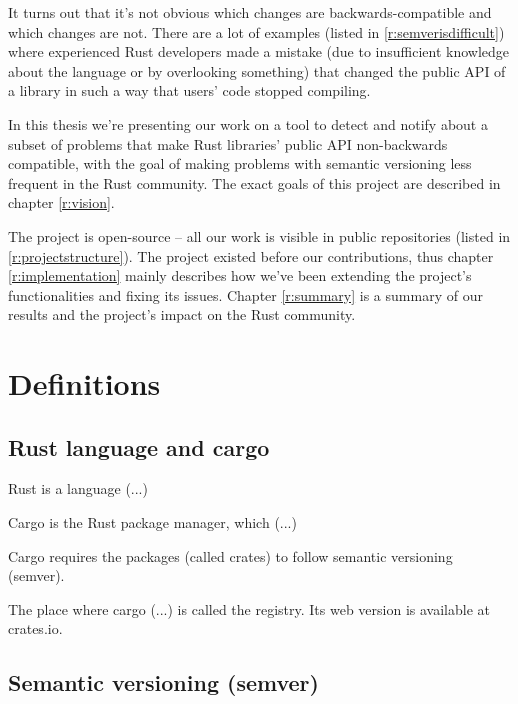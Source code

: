 \documentclass[licencjacka,en]{pracamgr}
\begin{document}
It turns out that it's not obvious which changes are backwards-compatible
and which changes are not. There are a lot of examples (listed in \ref{r:semverisdifficult})
where experienced Rust developers made a mistake 
(due to insufficient knowledge about the language or by overlooking something)
that changed the public API of a library in such a way that users' code stopped compiling.

In this thesis we're presenting our work on a tool to detect and notify about
a subset of problems that make Rust libraries' public API non-backwards compatible,
with the goal of making problems with semantic versioning less frequent in the Rust community.
The exact goals of this project are described in chapter \ref{r:vision}.

The project is open-source -- all our work is visible in public repositories
(listed in \ref{r:projectstructure}). The project existed before our contributions,
thus chapter \ref{r:implementation} mainly describes how we've 
been extending the project's functionalities and fixing its issues.
Chapter \ref{r:summary} is a summary of our results and the project's impact 
on the Rust community.



\chapter{Definitions}\label{r:definitions}

\section{Rust language and cargo}

Rust is a language (...)

Cargo is the Rust package manager, which (...)

Cargo requires the packages (called crates) to follow semantic versioning (semver).

The place where cargo (...) is called the registry.
Its web version is available at crates.io.


\section{Semantic versioning (semver)}

Semver is (...)

There are three types of release:
\begin{enumerate}
	\item patch -- (...)
	\item minor -- (...)
	\item major -- (...)
\end{enumerate}
\end{document}
